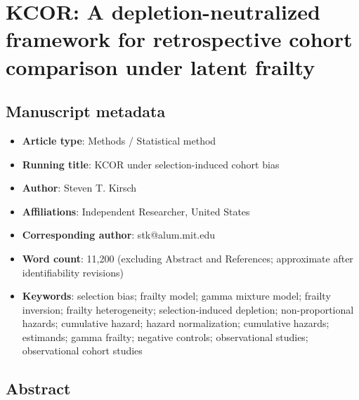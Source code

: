 \documentclass[
]{article}
\author{}
\date{}
\providecommand{\tightlist}{%
  \setlength{\itemsep}{0pt}\setlength{\parskip}{0pt}}
\begin{document}
\section{KCOR: A depletion-neutralized framework for retrospective
cohort comparison under latent
frailty}\label{kcor-a-depletion-neutralized-framework-for-retrospective-cohort-comparison-under-latent-frailty}

\subsection{Manuscript metadata}\label{manuscript-metadata}

\begin{itemize}
\tightlist
\item
  \textbf{Article type}: Methods / Statistical method
\item
  \textbf{Running title}: KCOR under selection-induced cohort bias
\item
  \textbf{Author}: Steven T. Kirsch
\item
  \textbf{Affiliations}: Independent Researcher, United States
\item
  \textbf{Corresponding author}: stk@alum.mit.edu
\item
  \textbf{Word count}: 11,200 (excluding Abstract and References;
  approximate after identifiability revisions)
\item
  \textbf{Keywords}: selection bias; frailty model; gamma mixture model;
  frailty inversion; frailty heterogeneity; selection-induced depletion;
  non-proportional hazards; cumulative hazard; hazard normalization;
  cumulative hazards; estimands; gamma frailty; negative controls;
  observational studies; observational cohort studies
\end{itemize}

\subsection{Abstract}\label{abstract}
\end{document}
